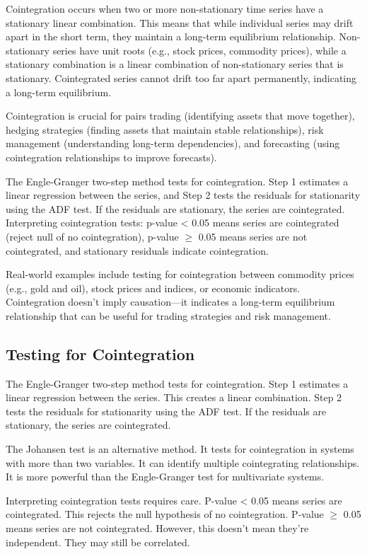 Cointegration occurs when two or more non-stationary time series have a stationary linear combination. This means that while individual series may drift apart in the short term, they maintain a long-term equilibrium relationship. Non-stationary series have unit roots (e.g., stock prices, commodity prices), while a stationary combination is a linear combination of non-stationary series that is stationary. Cointegrated series cannot drift too far apart permanently, indicating a long-term equilibrium.

Cointegration is crucial for pairs trading (identifying assets that move together), hedging strategies (finding assets that maintain stable relationships), risk management (understanding long-term dependencies), and forecasting (using cointegration relationships to improve forecasts).

The Engle-Granger two-step method tests for cointegration. Step 1 estimates a linear regression between the series, and Step 2 tests the residuals for stationarity using the ADF test. If the residuals are stationary, the series are cointegrated. Interpreting cointegration tests: p-value < 0.05 means series are cointegrated (reject null of no cointegration), p-value $\geq$ 0.05 means series are not cointegrated, and stationary residuals indicate cointegration.

Real-world examples include testing for cointegration between commodity prices (e.g., gold and oil), stock prices and indices, or economic indicators. Cointegration doesn't imply causation—it indicates a long-term equilibrium relationship that can be useful for trading strategies and risk management.

\subsection{Testing for Cointegration}

The Engle-Granger two-step method tests for cointegration. Step 1 estimates a linear regression between the series. This creates a linear combination. Step 2 tests the residuals for stationarity using the ADF test. If the residuals are stationary, the series are cointegrated.

The Johansen test is an alternative method. It tests for cointegration in systems with more than two variables. It can identify multiple cointegrating relationships. It is more powerful than the Engle-Granger test for multivariate systems.

Interpreting cointegration tests requires care. P-value < 0.05 means series are cointegrated. This rejects the null hypothesis of no cointegration. P-value $\geq$ 0.05 means series are not cointegrated. However, this doesn't mean they're independent. They may still be correlated.

